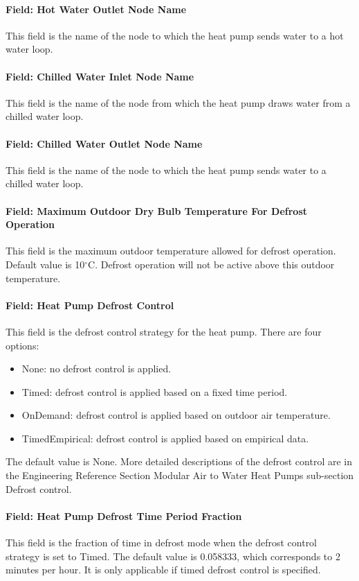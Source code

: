 \paragraph{Field: Hot Water Outlet Node Name} This field is the name of the node
to which the heat pump sends water to a hot water loop.
\paragraph{Field: Chilled Water Inlet Node Name} This field is the name of the
node from which the heat pump draws water from a chilled water loop.
\paragraph{Field: Chilled Water Outlet Node Name} This field is the name of the
node to which the heat pump sends water to a chilled water loop.
\paragraph{Field: Maximum Outdoor Dry Bulb Temperature For Defrost Operation}
This field is the maximum outdoor temperature allowed for defrost operation.
Default value is 10$^\circ$C. Defrost operation will not be active above this
outdoor temperature.
\paragraph{Field: Heat Pump Defrost Control} This field is the defrost control
strategy for the heat pump. There are four options:
\begin{itemize} %
    \item None: no defrost control is applied.
    \item Timed: defrost control is applied based on a fixed time period.
    \item OnDemand: defrost control is applied based on outdoor air temperature.
    \item TimedEmpirical: defrost control is applied based on empirical data.
\end{itemize} The default value is None.
More detailed descriptions of the defrost control are in the Engineering Reference
Section Modular Air to Water Heat Pumps sub-section Defrost control.
\paragraph{Field: Heat Pump Defrost Time Period Fraction} This field is the
fraction of time in defrost mode when the defrost control strategy is set to
Timed. The default value is 0.058333, which corresponds to 2 minutes per hour.
It is only applicable if timed defrost control is specified.
